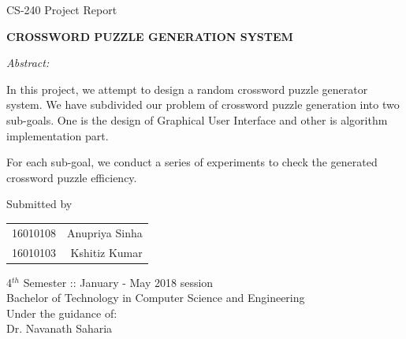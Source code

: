\begin{titlepage}


\hfill {\small {CS-240 Project} Report}
\vspace*{0.8 cm}
\begin{center}

\Large \textbf {CROSSWORD PUZZLE GENERATION SYSTEM}\\[0.5in]



\vspace*{1.5 cm}

\noindent\makebox[\linewidth]{\rule{\paperwidth}{0.4pt}}
{\small{ \emph{Abstract:}
\begin{onehalfspace}
{\en In this project, we attempt to design a random crossword puzzle generator system. We have subdivided our problem of crossword puzzle generation into two sub-goals. One is the design of Graphical User Interface and other is algorithm implementation part.

\noindent 
For each sub-goal, we conduct a series of experiments to check the generated crossword puzzle efficiency.


} 
\end{onehalfspace}
}}
\noindent\makebox[\linewidth]{\rule{\paperwidth}{0.4pt}}



\vspace*{0.8 cm}

\normalsize Submitted by

\vspace*{0.8 cm}

{\centering
\begin{tabular}{lr} %
16010108 & Anupriya Sinha \\
16010103 & Kshitiz Kumar \\ 
\end{tabular}}


\vspace*{0.5 cm}
4$^{th}$ Semester :: January - May 2018 session \\
{Bachelor of Technology in Computer Science and Engineering}\\ 







\vspace{2.0 cm}
Under the guidance of:\\ {Dr. Navanath Saharia} 


\end{center}
\end{titlepage}
